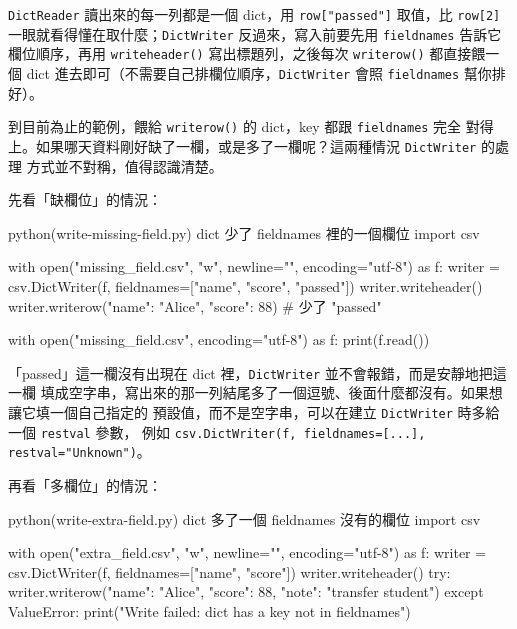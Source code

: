 
\texttt{DictReader} 讀出來的每一列都是一個 dict，用 \texttt{row["passed"]} 取值，比
\texttt{row[2]} 一眼就看得懂在取什麼；\texttt{DictWriter} 反過來，寫入前要先用
\texttt{fieldnames} 告訴它欄位順序，再用 \texttt{writeheader()} 寫出標題列，之後每次
\texttt{writerow()} 都直接餵一個 dict 進去即可（不需要自己排欄位順序，\texttt{DictWriter}
會照 \texttt{fieldnames} 幫你排好）。


到目前為止的範例，餵給 \texttt{writerow()} 的 dict，key 都跟 \texttt{fieldnames} 完全
對得上。如果哪天資料剛好缺了一欄，或是多了一欄呢？這兩種情況 \texttt{DictWriter} 的處理
方式並不對稱，值得認識清楚。

先看「缺欄位」的情況：

\begin{example}{python}{(write-missing-field.py) dict 少了 fieldnames 裡的一個欄位}
import csv

with open("missing_field.csv", "w", newline="", encoding="utf-8") as f:
    writer = csv.DictWriter(f, fieldnames=["name", "score", "passed"])
    writer.writeheader()
    writer.writerow({"name": "Alice", "score": 88})   # 少了 "passed"

with open("missing_field.csv", encoding="utf-8") as f:
    print(f.read())
\end{example}


「passed」這一欄沒有出現在 dict 裡，\texttt{DictWriter} 並不會報錯，而是安靜地把這一欄
填成空字串，寫出來的那一列結尾多了一個逗號、後面什麼都沒有。如果想讓它填一個自己指定的
預設值，而不是空字串，可以在建立 \texttt{DictWriter} 時多給一個 \texttt{restval} 參數，
例如 \texttt{csv.DictWriter(f, fieldnames=[...], restval="Unknown")}。

再看「多欄位」的情況：

\begin{example}{python}{(write-extra-field.py) dict 多了一個 fieldnames 沒有的欄位}
import csv

with open("extra_field.csv", "w", newline="", encoding="utf-8") as f:
    writer = csv.DictWriter(f, fieldnames=["name", "score"])
    writer.writeheader()
    try:
        writer.writerow({"name": "Alice", "score": 88, "note": "transfer student"})
    except ValueError:
        print("Write failed: dict has a key not in fieldnames")
\end{example}


